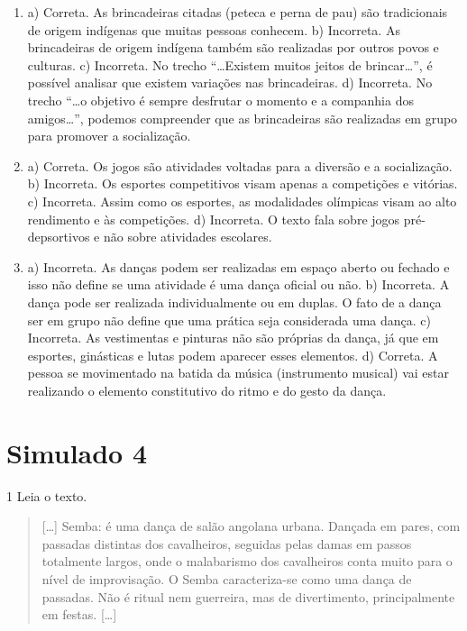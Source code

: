 
\begin{enumerate}

\item
a) Correta. As brincadeiras citadas (peteca e perna de pau) são tradicionais de origem indígenas que muitas pessoas
conhecem.
b) Incorreta. As brincadeiras de origem indígena também são
realizadas por outros povos e culturas.
c) Incorreta. No trecho “\ldots{}Existem muitos jeitos de
brincar\ldots{}”, é possível analisar que existem variações nas brincadeiras.
d) Incorreta. No trecho “\ldots{}o objetivo é sempre desfrutar o
momento e a companhia dos amigos\ldots{}”, podemos compreender que as
brincadeiras são realizadas em grupo para promover a socialização.

\item
a) Correta. Os jogos são atividades voltadas para a diversão e a socialização.
b) Incorreta. Os esportes competitivos visam apenas a competições e vitórias.
c) Incorreta. Assim como os esportes, as modalidades olímpicas
visam ao alto rendimento e às competições.
d) Incorreta. O texto fala sobre jogos pré-depsortivos e não
sobre atividades escolares.

\item
a) Incorreta. As danças podem ser realizadas em espaço aberto ou
fechado e isso não define se uma atividade é uma dança oficial ou não.
b) Incorreta. A dança pode ser realizada individualmente ou em
duplas. O fato de a dança ser em grupo não define que uma prática seja
considerada uma dança.
c) Incorreta. As vestimentas e pinturas não são próprias da
dança, já que em esportes, ginásticas e lutas podem aparecer esses elementos.
d) Correta. A pessoa se movimentado na batida da música
(instrumento musical) vai estar realizando o elemento constitutivo do
ritmo e do gesto da dança.
\end{enumerate}

\chapter{Simulado 4}

\num{1} Leia o texto.
\begin{quote}
  {[}\ldots{}{]} Semba: é uma dança de salão angolana urbana. Dançada em pares, com
  passadas distintas dos cavalheiros, seguidas pelas damas em passos
  totalmente largos, onde o malabarismo dos cavalheiros conta muito para
  o nível de improvisação. O Semba caracteriza-se como uma dança de
  passadas. Não é ritual nem guerreira, mas de divertimento,
  principalmente em festas. {[}\ldots{}{]}

\end{quote}

